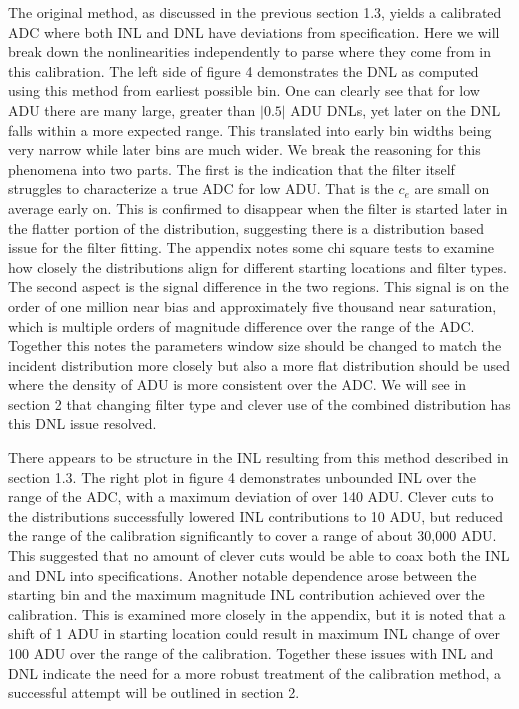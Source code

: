 \documentclass[11pt, letterpaper]{article}
\begin{document}
The original method, as discussed in the previous section 1.3, yields a calibrated ADC where both INL and DNL have deviations from specification. 
Here we will break down the nonlinearities independently to parse where they come from in this calibration. 
The left side of figure 4 demonstrates the DNL as computed using this method from earliest possible bin. 
One can clearly see that for low ADU there are many large, greater than $|0.5|$ ADU DNLs, yet later on the DNL falls within a more expected range. 
This translated into early bin widths being very narrow while later bins are much wider. 
We break the reasoning for this phenomena into two parts. 
The first is the indication that the filter itself struggles to characterize a true ADC for low ADU.
That is the $c_{e}$ are small on average early on. 
This is confirmed to disappear when the filter is started later in the flatter portion of the distribution, suggesting there is a distribution based issue for the filter fitting. 
The appendix notes some chi square tests to examine how closely the distributions align for different starting locations and filter types. 
The second aspect is the signal difference in the two regions. 
This signal is on the order of one million near bias and approximately five thousand near saturation, which is multiple orders of magnitude difference over the range of the ADC.
Together this notes the parameters window size should be changed to match the incident distribution more closely but also a more flat distribution should be used where the density of ADU is more consistent over the ADC.
We will see in section 2 that changing filter type and clever use of the combined distribution has this DNL issue resolved. 
\indent 


There appears to be structure in the INL resulting from this method described in section 1.3.
The right plot in figure 4 demonstrates unbounded INL over the range of the ADC, with a maximum deviation of over 140 ADU. 
Clever cuts to the distributions successfully lowered INL contributions to 10 ADU, but reduced the range of the calibration significantly to cover a range of about 30,000 ADU. 
This suggested that no amount of clever cuts would be able to coax both the INL and DNL into specifications. 
Another notable dependence arose between the starting bin and the maximum magnitude INL contribution achieved over the calibration. 
This is examined more closely in the appendix, but it is noted that a shift of 1 ADU in starting location could result in maximum INL change of over 100 ADU over the range of the calibration. 
Together these issues with INL and DNL indicate the need for a more robust treatment of the calibration method, a successful attempt will be outlined in section 2.
\end{document}

